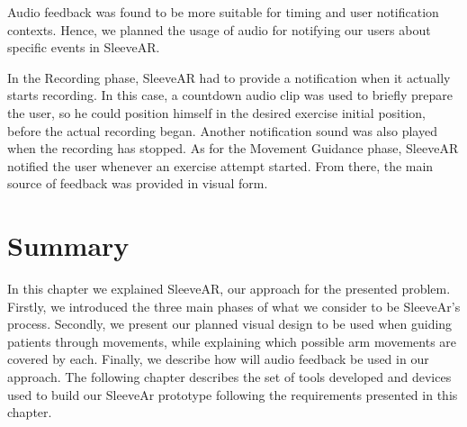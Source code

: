 Audio feedback was found to be more suitable for timing and user notification contexts. 
Hence, we planned the usage of audio for notifying our users about specific events in SleeveAR.

In the Recording phase, SleeveAR had to provide a notification when it actually starts recording. 
In this case, a countdown audio clip was used to briefly prepare the user, so he could
position himself in the desired exercise initial position, before the actual recording began. 
Another notification sound was also played when the recording has stopped.
As for the Movement Guidance phase, SleeveAR notified the user whenever an exercise attempt started. 
From there, the main source of feedback was provided in visual form.

\section{Summary}

In this chapter we explained SleeveAR, our approach for the presented problem. Firstly, we introduced the three main phases of what we consider to be
SleeveAr's process. Secondly, we present our planned visual design to be used when guiding patients through movements, while explaining which possible arm movements are covered by each. Finally, we describe how will audio feedback be used in our approach.
The following chapter describes the set of tools developed and devices used to build our SleeveAr prototype following the requirements presented in this chapter.
